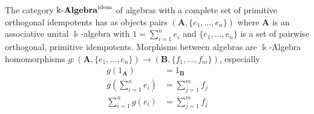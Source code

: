 \begin{definition}
The category $\Bbbk\textnormal{-}\mathbf{Algebra}^{\text{idem}}$ of algebras with a complete set of primitive orthogonal idempotents has
as objects pairs $(\mathbf{A},\{e_{1},\dots,e_{n}\})$ where $\mathbf{A}$ is an associative unital $\Bbbk$-algebra with
$1 = \sum_{i=1}^{n} e_{i}$ and $\{e_{1},\dots,e_{n}\}$ is a set of pairwise orthogonal, primitive idempotents.
Morphisms between algebras are $\Bbbk$-Algebra homomorphisms
$g : (\mathbf{A},\{e_{1},\dots,e_{n}\}) \rightarrow (\mathbf{B},\{f_{1},\dots,f_{m}\})$, especially
\begin{align}
g(1_{\mathbf{A}}) &= 1_{\mathbf{B}} \\
g( \sum_{i=1}^{n} e_{i} ) &=  \sum_{j=1}^{m} f_{j} \\
 \sum_{i=1}^{n} g( e_{i} ) &=  \sum_{j=1}^{m} f_{j}
\end{align}
\end{definition}
